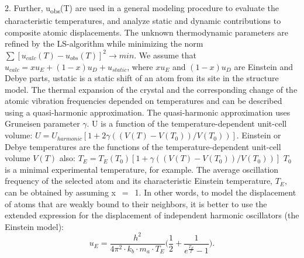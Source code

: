 \documentclass[preprint,review,12pt]{elsarticle}
\begin{document}
2. Further,  u\textsubscript{obs}(T) are used in a general modeling procedure to evaluate the characteristic temperatures, and analyze static and dynamic contributions to composite atomic displacements. The unknown thermodynamic parameters are refined by the LS-algorithm while minimizing the norm
$\sum [u_{calc}(T) - u_{obs}(T)]^2 \rightarrow min$.
We assume that $u_{calc}=xu_{E}+(1-x)u_{D}+u_{static}$, where $xu_{E}$ and $(1-x)u_{D}$ are Einstein and Debye parts, ustatic is a static shift of an atom from its site in the structure model.
The thermal expansion of the crystal and the corresponding change of the atomic vibration frequencies depended on temperatures and can be described using a quasi-harmonic approximation. The quasi-harmonic approximation uses Gruneisen parameter $\gamma$. U is a function of the temperature-dependent unit-cell volume:
$U = U_{harmonic}[1 + 2\gamma((V(T)-V(T_0))/V(T_{0}))]$.
Einstein or Debye temperatures are the functions of the temperature-dependent unit-cell volume $V(T)$ also:
$T_{E} = T_{E}(T_{0})[1 + \gamma((V(T)-V(T_0))/V(T_{0}))]$
$T_{0}$ is a minimal experimental temperature, for example.
The average oscillation frequency of the selected atom and its characteristic Einstein temperature, $T_{E}$, can be obtained by assuming x~$=$~1. In other words, to model the displacement of atoms that are weakly bound to their neighbors, it is better to use the extended expression for the displacement of independent harmonic oscillators (the Einstein model):
\[
u_{E}=\frac{h^2}{4\pi^2\cdot k_{b} \cdot m_{a} \cdot T_{E}} \Big(\frac{1}{2} + \frac{1}{e^{\frac{T_{E}}{T}}-1} \Big).
\]
\end{document}
